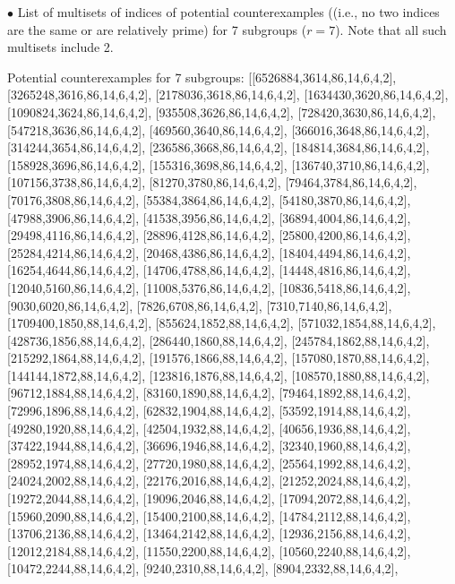 \documentclass[12pt]{amsart}
\def \n{\noindent }
\def \bs{\bigskip}
\begin{document}
\bs

\n $\bullet$ List of multisets of indices of potential counterexamples ((i.e.,  no two indices are the same or are relatively prime) for 7 subgroups ($r=7$). Note that all such
multisets include 2.

\bs

Potential counterexamples for 7 subgroups: [[6526884,3614,86,14,6,4,2],   [3265248,3616,86,14,6,4,2],   [2178036,3618,86,14,6,4,2],   [1634430,3620,86,14,6,4,2],
[1090824,3624,86,14,6,4,2],   [935508,3626,86,14,6,4,2],   [728420,3630,86,14,6,4,2],   [547218,3636,86,14,6,4,2],   [469560,3640,86,14,6,4,2],
[366016,3648,86,14,6,4,2],   [314244,3654,86,14,6,4,2],   [236586,3668,86,14,6,4,2],   [184814,3684,86,14,6,4,2],   [158928,3696,86,14,6,4,2],
[155316,3698,86,14,6,4,2],   [136740,3710,86,14,6,4,2],   [107156,3738,86,14,6,4,2],   [81270,3780,86,14,6,4,2],   [79464,3784,86,14,6,4,2],   [70176,3808,86,14,6,4,2],
[55384,3864,86,14,6,4,2],   [54180,3870,86,14,6,4,2],   [47988,3906,86,14,6,4,2],   [41538,3956,86,14,6,4,2],   [36894,4004,86,14,6,4,2],   [29498,4116,86,14,6,4,2],
[28896,4128,86,14,6,4,2],   [25800,4200,86,14,6,4,2],   [25284,4214,86,14,6,4,2],   [20468,4386,86,14,6,4,2],   [18404,4494,86,14,6,4,2],   [16254,4644,86,14,6,4,2],
[14706,4788,86,14,6,4,2],   [14448,4816,86,14,6,4,2],   [12040,5160,86,14,6,4,2],   [11008,5376,86,14,6,4,2],   [10836,5418,86,14,6,4,2],   [9030,6020,86,14,6,4,2],
[7826,6708,86,14,6,4,2],   [7310,7140,86,14,6,4,2],   [1709400,1850,88,14,6,4,2],   [855624,1852,88,14,6,4,2],   [571032,1854,88,14,6,4,2],   [428736,1856,88,14,6,4,2],
[286440,1860,88,14,6,4,2],   [245784,1862,88,14,6,4,2],   [215292,1864,88,14,6,4,2],   [191576,1866,88,14,6,4,2],   [157080,1870,88,14,6,4,2],
[144144,1872,88,14,6,4,2],   [123816,1876,88,14,6,4,2],   [108570,1880,88,14,6,4,2],   [96712,1884,88,14,6,4,2],   [83160,1890,88,14,6,4,2],   [79464,1892,88,14,6,4,2],
[72996,1896,88,14,6,4,2],   [62832,1904,88,14,6,4,2],   [53592,1914,88,14,6,4,2],   [49280,1920,88,14,6,4,2],   [42504,1932,88,14,6,4,2],   [40656,1936,88,14,6,4,2],
[37422,1944,88,14,6,4,2],   [36696,1946,88,14,6,4,2],   [32340,1960,88,14,6,4,2],   [28952,1974,88,14,6,4,2],   [27720,1980,88,14,6,4,2],   [25564,1992,88,14,6,4,2],
[24024,2002,88,14,6,4,2],   [22176,2016,88,14,6,4,2],   [21252,2024,88,14,6,4,2],   [19272,2044,88,14,6,4,2],   [19096,2046,88,14,6,4,2],   [17094,2072,88,14,6,4,2],
[15960,2090,88,14,6,4,2],   [15400,2100,88,14,6,4,2],   [14784,2112,88,14,6,4,2],   [13706,2136,88,14,6,4,2],   [13464,2142,88,14,6,4,2],   [12936,2156,88,14,6,4,2],
[12012,2184,88,14,6,4,2],   [11550,2200,88,14,6,4,2],   [10560,2240,88,14,6,4,2],   [10472,2244,88,14,6,4,2],   [9240,2310,88,14,6,4,2],   [8904,2332,88,14,6,4,2],
\end{document}

